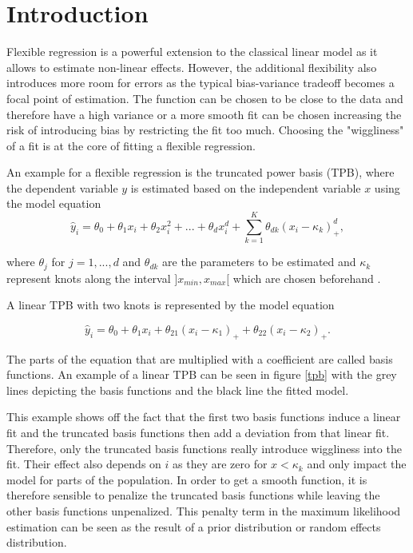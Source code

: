 \documentclass[12pt]{article}
\begin{document}
\begin{titlepage}
\clearpage
\end{titlepage}

\setcounter{page}{2}
\tableofcontents
\clearpage

\section{Introduction}\label{intro}

Flexible regression is a powerful extension to the classical linear model as it allows to estimate non-linear effects. However, the additional flexibility also introduces more room for errors as the typical bias-variance tradeoff becomes a focal point of estimation. The function can be chosen to be close to the data and therefore have a high variance or a more smooth fit can be chosen increasing the risk of introducing bias by restricting the fit too much. Choosing the "wiggliness" of a fit is at the core of fitting a flexible regression.

An example for a flexible regression is the truncated power basis (TPB), where the dependent variable $y$ is estimated based on the independent variable $x$ using the model equation
$$\hat{y}_i = 
 \theta_0 + \theta_1x_i + \theta_2x_i^2 + ... + \theta_dx_i^d + \sum_{k=1}^K \theta_{dk}(x_i-\kappa_k)_+^d,$$
 
 where $\theta_j$ for $j= 1,...,d$ and $\theta_{dk}$ are the parameters to be estimated and $\kappa_k$ represent knots along the interval $]x_{min},x_{max}[$ which are chosen beforehand \cite{ruppert2003semiparametric, wand2003smoothing}.
 
  A linear TPB with two knots is represented by the model equation
 
 $$\hat{y}_i = 
 \theta_0 + \theta_1x_i +  \theta_{21}(x_i-\kappa_1)_+ + \theta_{22}(x_i-\kappa_2)_+.$$
 
 The parts of the equation that are multiplied with a coefficient are called basis functions. 
An example of a linear TPB can be seen in figure \ref{tpb} with the grey lines depicting the basis functions and the black line the fitted model.
 
This example shows off the fact that the first two basis functions induce a linear fit and the truncated basis functions then add a deviation from that linear fit. Therefore, only the truncated basis functions really introduce wiggliness into the fit. 
Their effect also depends on $i$ as they are zero for $x<\kappa_k$ and only impact the model for parts of the population. 
In order to get a smooth function, it is therefore sensible to penalize the truncated basis functions while leaving the other basis functions unpenalized. This penalty term in the maximum likelihood estimation can be seen as the result of a prior distribution or random effects distribution. 
\end{document}
